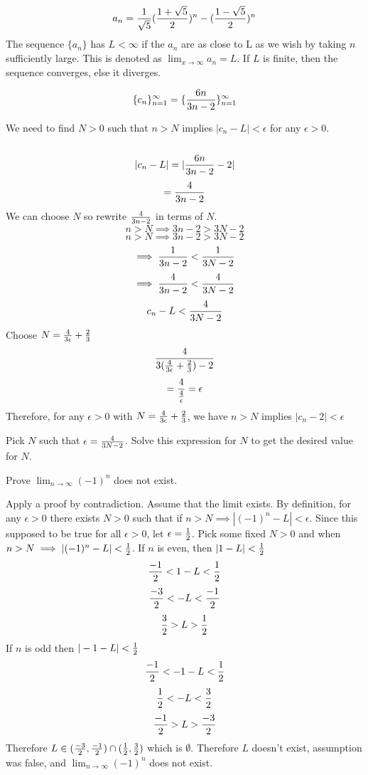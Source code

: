 \documentclass[english, 12pt]{article}
\begin{document}
\[a_{n} = \frac{1}{\sqrt{5}} (\frac{1+\sqrt{5}}{2})^n - (\frac{1-\sqrt{5}}{2})^n  \]
The sequence $\{a_{n}\}$ has $L < \infty$ if the $a_{n}$ are as close to L as we wish by taking $n$ sufficiently large. This is denoted as $\lim_{x \to \infty} a_{n} = L$. If $L$ is finite, then the sequence converges, else it diverges.
\begin{exmp}
\[ \{c_{n}\}_{n=1}^\infty = \{\frac{6n}{3n-2} \}_{n=1}^\infty \]
\begin{sol}
We need to find $N > 0$ such that $n > N$ implies $|c_{n} - L | < \epsilon$ for any $\epsilon > 0$.\\\\
\[|c_{n}-L|= |\frac{6n}{3n-2} -2| \]
\[=\frac{4}{3n-2} \]
We can choose $N$ so rewrite $\frac{4}{3n-2}$ in terms of $N$.
\[ n > N \implies 3n -2 > 3N -2 \]
\[ n > N \implies 3n -2 > 3N -2 \]
\[ \implies \frac{1}{3n-2} < \frac{1}{3N-2} \]
\[ \implies \frac{4}{3n-2} < \frac{4}{3N-2} \]
\[c_{n}-L < \frac{4}{3N-2} \]
Choose $N = \frac{4}{3\epsilon} + \frac{2}{3}$
\[ \frac{4}{3(\frac{4}{3\epsilon} + \frac{2}{3})-2} \]
\[ = \frac{4}{\frac{4}{\epsilon}} = \epsilon \]
Therefore, for any $\epsilon > 0$ with $N = \frac{4}{3\epsilon} + \frac{2}{3}$, we have $n > N$ implies $|c_{n} - 2| < \epsilon$
\end{sol}
\end{exmp}
\begin{note}
Pick $N$ such that $\epsilon = \frac{4}{3N-2}$. Solve this expression for $N$ to get the desired value for $N$.
\end{note}
\begin{exmp}
Prove $\lim_{n \to \infty} (-1)^n$ does not exist.
\begin{sol}
Apply a proof by contradiction. Assume that the limit exists. By definition, for any $\epsilon > 0$ there exists $N >0$ such that if $n > N \implies |(-1)^n -L| < \epsilon$. Since this supposed to be true for all $\epsilon > 0$, let $\epsilon = \frac{1}{2}$. Pick some fixed $N > 0$ and when $n > N \implies |(-1)^n -L| < \frac{1}{2}$. If $n$ is even, then $|1 - L| < \frac{1}{2}$
\[\frac{-1}{2} < 1 - L< \frac{1}{2} \]
\[\frac{-3}{2} < -L < \frac{-1}{2} \]
\[\frac{3}{2} > L > \frac{1}{2} \]
If $n$ is odd then $| -1 - L | < \frac{1}{2}$
\[\frac{-1}{2} < -1 - L < \frac{1}{2} \]
\[ \frac{1}{2} < -L < \frac{3}{2} \]
\[\frac{-1}{2} > L > \frac{-3}{2} \]
Therefore $L \in (\frac{-3}{2},\frac{-1}{2})\cap (\frac{1}{2},\frac{3}{2})$ which is $\emptyset$. Therefore $L$ doesn't exist, assumption was false, and $\lim_{n \to \infty} (-1)^n$ does not exist.
\end{sol}
\end{exmp}
\end{document}
